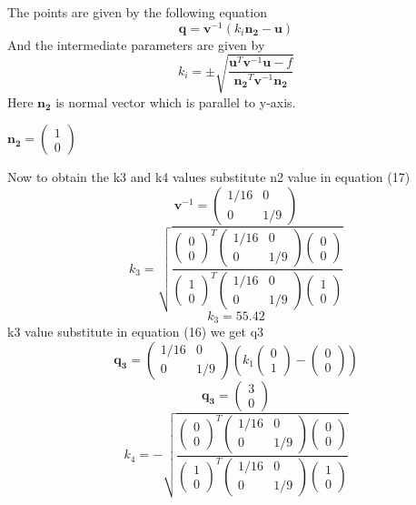 \documentclass[10pt, a4paper]{article}
\newcommand{\myvec}[1]{\ensuremath{\begin{pmatrix}#1\end{pmatrix}}}
\let\vec\mathbf
\begin{document}
The points are given by the following equation\\
\begin{equation}
\vec{q}=\vec{v}^{-1}(k_i\vec{n_2}-\vec{u})
\end{equation}
And the intermediate parameters are given by\\
\begin{equation}
k_i=\pm\sqrt{\frac{\vec{u}^T\vec{v}^{-1}\vec{u}-f}{\vec{n_2}^T\vec{v}^{-1}\vec{n_2}}}
\end{equation}
Here $\vec{n_2}$ is normal vector which is parallel to y-axis.\\
\begin{center}
		$\vec{n_2}=\myvec{1\\0}$\\
\end{center}
Now to obtain the k3 and k4 values substitute n2 value in equation (17)\\
\begin{equation}
\vec{v}^{-1}=\myvec{1/16&0\\0&1/9}
\end{equation}
\begin{equation}
k_3=\sqrt{\frac{\myvec{0\\0}^T\myvec{1/16&0\\0&1/9}\myvec{0\\0}}{\myvec{1\\0}^T\myvec{1/16&0\\0&1/9}\myvec{1\\0}}}
\end{equation}
\begin{equation}
k_3=55.42
\end{equation}
k3 value substitute in equation (16) we get q3\\
\begin{equation}
\vec{q_3}={\myvec{1/16&0\\0&1/9}(k_1\myvec{0\\1}-\myvec{0\\0})}
\end{equation}
\begin{equation}
\vec{q_3}=\myvec{3\\0}
\end{equation}
\begin{equation}
k_4=-\sqrt{\frac{\myvec{0\\0}^T\myvec{1/16&0\\0&1/9}\myvec{0\\0}}{\myvec{1\\0}^T\myvec{1/16&0\\0&1/9}\myvec{1\\0}}}
\end{equation}
\end{document}
